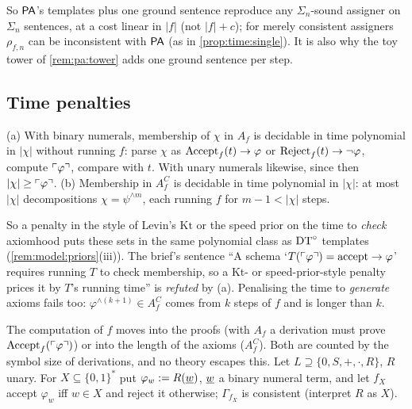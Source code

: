 So $\mathsf{PA}$'s templates plus one ground sentence reproduce any $\Sigma_n$-sound assigner on $\Sigma_n$ sentences, at a cost linear in $|f|$ (not $|f|+c$); for merely consistent assigners $\rho_{f,n}$ can be inconsistent with $\mathsf{PA}$ (as in \cref{prop:time:single}). It is also why the toy tower of \cref{rem:pa:tower} adds one ground sentence per step.

\subsection{Time penalties}\label{sec:time:penalties}

\begin{proposition}\label{prop:time:cheap}
(a) With binary numerals, membership of $\chi$ in $A_f$ is decidable in time polynomial in $|\chi|$ without running $f$: parse $\chi$ as $\mathrm{Accept}_{f}(t)\to\varphi$ or $\mathrm{Reject}_{f}(t)\to\neg\varphi$, compute $\ulcorner \varphi\urcorner$, compare with $t$. With unary numerals likewise, since then $|\chi|\ge\ulcorner \varphi\urcorner$.
(b) Membership in $A^C_f$ is decidable in time polynomial in $|\chi|$: at most $|\chi|$ decompositions $\chi=\psi^{\wedge m}$, each running $f$ for $m-1<|\chi|$ steps.
\end{proposition}

So a penalty in the style of Levin's $\mathrm{Kt}$ or the speed prior on the time to \emph{check} axiomhood puts these sets in the same polynomial class as $\mathrm{DT}^{\circ}$ templates (\cref{rem:model:priors}(iii)). The brief's sentence ``A schema `$T(\ulcorner \varphi\urcorner)=\text{accept}\to\varphi$' requires running $T$ to check membership, so a Kt- or speed-prior-style penalty prices it by $T$'s running time'' is \emph{refuted} by (a). Penalising the time to \emph{generate} axioms fails too: $\varphi^{\wedge(k+1)}\in A^C_f$ comes from $k$ steps of $f$ and is longer than $k$.

The computation of $f$ moves into the proofs (with $A_f$ a derivation must prove $\mathrm{Accept}_{f}(\ulcorner \varphi\urcorner)$) or into the length of the axioms ($A^C_f$). Both are counted by the symbol size of derivations, and no theory escapes this. Let $L\supseteq\{0,S,+,\cdot,R\}$, $R$ unary. For $X\subseteq\{0,1\}^*$ put $\varphi_w:=R(\underline{w})$, $\underline{w}$ a binary numeral term, and let $f_X$ accept $\varphi_w$ iff $w\in X$ and reject it otherwise; $\Gamma_{f_X}$ is consistent (interpret $R$ as $X$).

